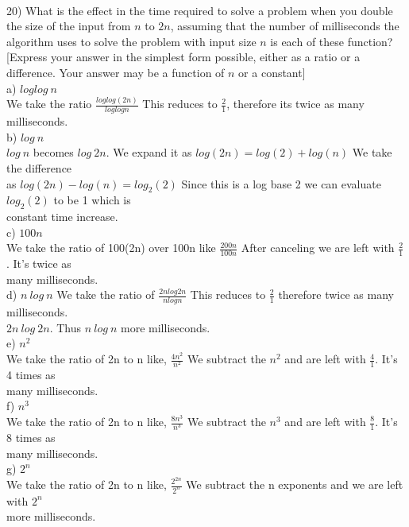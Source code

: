 \documentclass{article}
\begin{document}
\begin{flushleft}
~\\
\setlength\parindent{0pt}20) What is the effect in the time required to solve a problem when you double the size of the input from $n$ to $2n$, assuming that the number of milliseconds the algorithm uses to solve the problem with input size $n$ is each of these function?  [Express your answer in the simplest form possible, either as a ratio or a difference.  Your answer may be a function of $n$ or a constant] \\
\setlength\parindent{24pt}a) $log log \:n$ \\
\setlength\parindent{48pt} We take the ratio $\frac{loglog(2n)}{log log n}$ This reduces to $\frac{2}{1}$, therefore its twice as many milliseconds.\\
\setlength\parindent{24pt}b) $log \: n$ \\
\setlength\parindent{48pt} $log \: n$ becomes $log \: 2n$.  We expand it as $log(2n) = log(2) + log(n)$  We take the difference \\as $log(2n) - log(n) = log_2(2)$  Since this is a log base 2 we can evaluate $log_2(2) $ to be 1 which is \\constant time increase.\\
\setlength\parindent{24pt}c) $100n$ \\
\setlength\parindent{48pt} We take the ratio of 100(2n) over 100n like $\frac{200n}{100n}$  After canceling we are left with $\frac{2}{1}$.  It's twice as \\many milliseconds.\\
\setlength\parindent{24pt}d) $n \: log \: n$ We take the ratio of $\frac{2nlog2n}{nlogn}$ This reduces to $\frac{2}{1}$ therefore twice as many milliseconds.\\
\setlength\parindent{48pt} $2n \: log \: 2n$.  Thus $n\:log\:n$ more milliseconds. \\
\setlength\parindent{24pt}e) $n^2$ \\
\setlength\parindent{48pt} We take the ratio of 2n to n like, $\frac{4n^2}{n^2}$ We subtract the $n^2$ and are left with $\frac{4}{1}$.  It's 4 times as \\many milliseconds.\\
\setlength\parindent{24pt}f) $n^3$ \\
\setlength\parindent{48pt} We take the ratio of 2n to n like, $\frac{8n^3}{n^3}$ We subtract the $n^3$ and are left with $\frac{8}{1}$.  It's 8 times as \\many milliseconds. \\
\setlength\parindent{24pt}g) $2^n$ \\
\setlength\parindent{48pt} We take the ratio of 2n to n like, $\frac{2^{2n}}{2^n}$ We subtract the n exponents and we are left with $2^n$ \\more milliseconds.


\end{flushleft}
\end{document}
